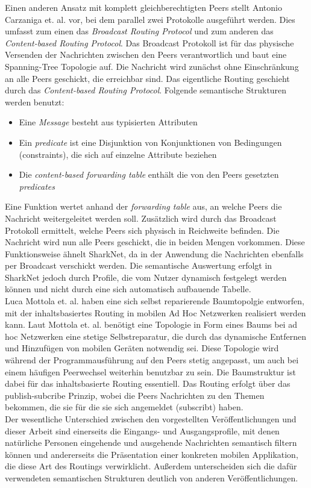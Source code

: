 Einen anderen Ansatz mit komplett gleichberechtigten Peers stellt Antonio Carzaniga et. al. vor, bei dem parallel zwei Protokolle ausgeführt werden. Dies umfasst zum einen das \textit{Broadcast Routing Protocol} und zum anderen das \textit{Content-based Routing Protocol}. Das Broadcast Protokoll ist für das physische Versenden der Nachrichten zwischen den Peers verantwortlich und baut eine Spanning-Tree Topologie auf. Die Nachricht wird zunächst ohne Einschränkung an alle Peers geschickt, die erreichbar sind. Das eigentliche Routing geschieht durch das \textit{Content-based Routing Protocol}. Folgende semantische Strukturen werden benutzt:
\begin{itemize}
	\item Eine \textit{Message} besteht aus typisierten Attributen
	\item Ein \textit{predicate} ist eine Disjunktion von Konjunktionen von Bedingungen (constraints), die sich auf einzelne Attribute beziehen
	\item Die \textit{content-based forwarding table} enthält die von den Peers gesetzten \textit{predicates} 	
\end{itemize}
Eine Funktion wertet anhand der \textit{forwarding table} aus, an welche Peers die Nachricht weitergeleitet werden soll. Zusätzlich wird durch das Broadcast Protokoll ermittelt, welche Peers sich physisch in Reichweite befinden. Die Nachricht wird nun alle Peers geschickt, die in beiden Mengen vorkommen. Diese Funktionsweise ähnelt SharkNet, da in der Anwendung die Nachrichten ebenfalls per Broadcast verschickt werden. Die semantische Auswertung erfolgt in SharkNet jedoch durch Profile, die vom Nutzer dynamisch festgelegt werden können und nicht durch eine sich automatisch aufbauende Tabelle. 
\\Luca Mottola et. al. haben eine sich selbst reparierende Baumtopolgie entworfen, mit der inhaltsbasiertes Routing in mobilen Ad Hoc Netzwerken realisiert werden kann. Laut Mottola et. al. benötigt eine Topologie in Form eines Baums bei ad hoc Netzwerken eine stetige Selbstreparatur, die durch das dynamische Entfernen und Hinzufügen von mobilen Geräten notwendig sei. Diese Topologie wird während der Programmausführung auf den Peers stetig angepasst, um auch bei einem häufigen Peerwechsel weiterhin benutzbar zu sein. Die Baumstruktur ist dabei für das inhaltsbasierte Routing essentiell. Das Routing erfolgt über das publish-subcribe Prinzip, wobei die Peers Nachrichten zu den Themen bekommen, die sie für die sie sich angemeldet (subscribt) haben. 
\\Der wesentliche Unterschied zwischen den vorgestellten Veröffentlichungen und dieser Arbeit sind einerseits die Eingangs- und Ausgangsprofile, mit denen natürliche Personen eingehende und ausgehende Nachrichten semantisch filtern können und andererseits die Präsentation einer konkreten mobilen Applikation, die diese Art des Routings verwirklicht. Außerdem unterscheiden sich die dafür verwendeten semantischen Strukturen deutlich von anderen Veröffentlichungen. 
